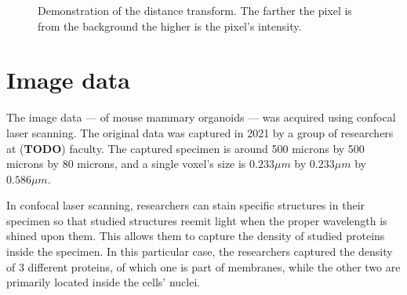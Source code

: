 \documentclass[
  digital,     %
  oneside,     %
  nosansbold,  %
  nocolorbold, %
  lof,         %
  lot,         %
]{fithesis4}
\begin{document}
\begin{figure}
\begin{subfigure}[t]{0.48\textwidth}
    \end{subfigure}
    \caption{Demonstration of the distance transform. The farther the pixel is
    from the background the higher is the pixel's intensity.}
    \label{fig:demonstration-distance-map}
\end{figure}

\chapter{Image data}

The image data --- of mouse mammary organoids --- was acquired using confocal
laser scanning. The original data was captured in 2021 by a group of
researchers at (\textbf{TODO}) faculty. The captured specimen is around 500
microns by 500 microns by 80 microns, and a single voxel's size is $0.233\mu m$ by
$0.233\mu m$ by $0.586\mu m$.

In confocal laser scanning, researchers can stain specific structures in
their specimen so that studied structures reemit light when the proper wavelength
is shined upon them. This allows them to capture the density of studied proteins
inside the specimen. In this particular case, the researchers captured the
density of 3 different proteins, of which one is part of membranes, while the
other two are primarily located inside the cells' nuclei.
\end{document}

